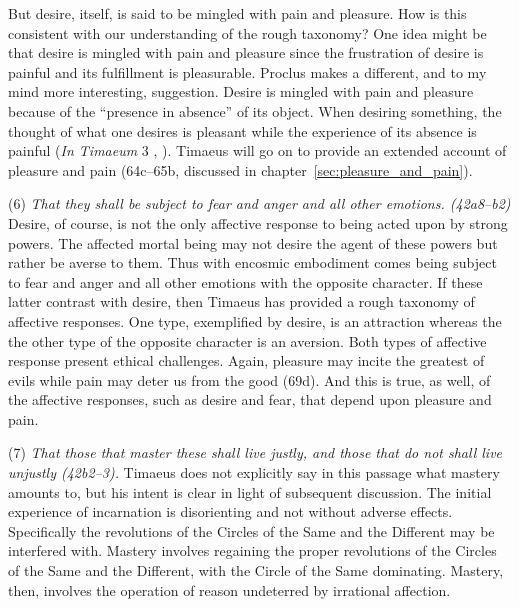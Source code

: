 But desire, itself, is said to be mingled with pain and pleasure. How is this consistent with our understanding of the rough taxonomy? One idea might be that desire is mingled with pain and pleasure since the frustration of desire is painful and its fulfillment is pleasurable. Proclus makes a different, and to my mind more interesting, suggestion. Desire is mingled with pain and pleasure because of the ``presence in absence'' of its object. When desiring something, the thought of what one desires is pleasant while the experience of its absence is painful (\emph{In Timaeum} 3  , \citealt{Diehl:1903re}). Timaeus will go on to provide an extended account of pleasure and pain (64c--65b, discussed in chapter~\ref{sec:pleasure_and_pain}).

(6) \emph{That they shall be subject to fear and anger and all other emotions. (42a8--b2)} Desire, of course, is not the only affective response to being acted upon by strong powers. The affected mortal being may not desire the agent of these powers but rather be averse to them. Thus with encosmic embodiment comes being subject to fear and anger and all other emotions with the opposite character. If these latter contrast with desire, then Timaeus has provided a rough taxonomy of affective responses. One type, exemplified by desire, is an attraction whereas the the other type of the opposite character is an aversion. Both types of affective response present ethical challenges. Again, pleasure may incite the greatest of evils while pain may deter us from the good (69d). And this is true, as well, of the affective responses, such as desire and fear, that depend upon pleasure and pain.

(7) \emph{That those that master these shall live justly, and those that do not shall live unjustly (42b2--3).} Timaeus does not explicitly say in this passage what mastery amounts to, but his intent is clear in light of subsequent discussion. The initial experience of incarnation is disorienting and not without adverse effects. Specifically the revolutions of the Circles of the Same and the Different may be interfered with. Mastery involves regaining the proper revolutions of the Circles of the Same and the Different, with the Circle of the Same dominating. Mastery, then, involves the operation of reason undeterred by irrational affection.

